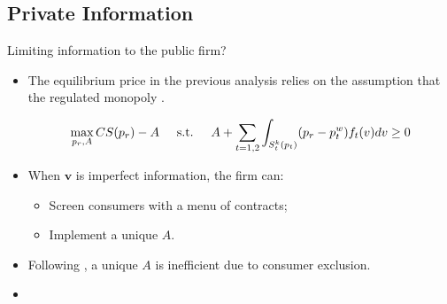 \documentclass{class}
\begin{document}
\subsection{Private Information}

\begin{frame}{Limiting information to the public firm?}\label{Extension1}

\begin{itemize}

\item The equilibrium price in the previous analysis relies on the assumption that the regulated monopoly .  

\begin{equation*}
 \max_{p_r,A} CS(p_r) - A \hspace{0.5cm} \text{s.t.} \hspace{0.5cm} A + \sum_{t=1,2} \int_{S_t^k(p_t)} (p_r-p_t^w)f_t(v)dv\geq 0
\end{equation*}

\vfill

\item When $\textbf{v}$ is imperfect information, the firm can:

\vfill

\begin{itemize}
    \item Screen consumers with a menu of contracts; \vfill
    \item Implement a unique $A$.
\end{itemize}

\vfill

\item  Following \cite{laffont1993theory}, a unique $A$ is inefficient due to consumer exclusion. \hyperlink{UniqueAPUWU}{}

\vfill

\item {}

\vfill

  \hyperlink{Net_DW2}{}   \hyperlink{UniqueAEq}{}

\end{itemize}


\end{frame}
\end{document}
